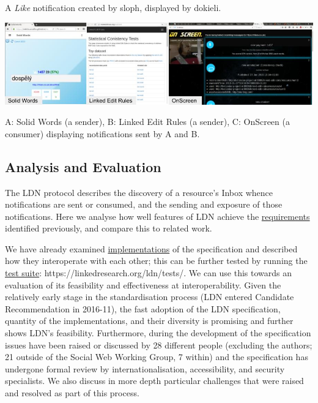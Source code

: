 \documentclass[]{article}
\begin{document}
A \emph{Like} notification created by sloph, displayed by dokieli.

\includegraphics{media/images/screenshot-ldn-senders.jpg}

A: Solid Words (a sender), B: Linked Edit Rules (a sender), C: OnScreen
(a consumer) displaying notifications sent by A and B.

\hypertarget{analysis-and-evaluation}{}
\hypertarget{analysis-and-evaluation}{\subsection{Analysis and
Evaluation}\label{analysis-and-evaluation}}

The LDN protocol describes the discovery of a resource's Inbox whence
notifications are sent or consumed, and the sending and exposure of
those notifications. Here we analyse how well features of LDN achieve
the
\protect\hyperlink{requirements-and-design-considerations}{requirements}
identified previously, and compare this to related work.

We have already examined
\protect\hyperlink{implementations}{implementations} of the
specification and described how they interoperate with each other; this
can be further tested by running the
\href{https://linkedresearch.org/ldn/tests/}{test suite}:
https://linkedresearch.org/ldn/tests/. We can use this towards an
evaluation of its feasibility and effectiveness at interoperability.
Given the relatively early stage in the standardisation process (LDN
entered Candidate Recommendation in 2016-11), the fast adoption of the
LDN specification, quantity of the implementations, and their diversity
is promising and further shows LDN's feasibility. Furthermore, during
the development of the specification issues have been raised or
discussed by 28 different people (excluding the authors; 21 outside of
the Social Web Working Group, 7 within) and the specification has
undergone formal review by internationalisation, accessibility, and
security specialists. We also discuss in more depth particular
challenges that were raised and resolved as part of this process.

\hypertarget{comparison-summary}{}
\end{document}
